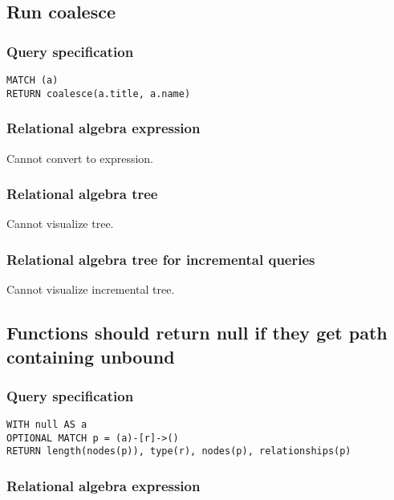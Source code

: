 \subsection{Run coalesce}

\subsubsection*{Query specification}

\begin{lstlisting}
MATCH (a)
RETURN coalesce(a.title, a.name)
\end{lstlisting}

\subsubsection*{Relational algebra expression}

Cannot convert to expression.

\subsubsection*{Relational algebra tree}

Cannot visualize tree.

\subsubsection*{Relational algebra tree for incremental queries}

Cannot visualize incremental tree.

\subsection{Functions should return null if they get path containing unbound}

\subsubsection*{Query specification}

\begin{lstlisting}
WITH null AS a
OPTIONAL MATCH p = (a)-[r]->()
RETURN length(nodes(p)), type(r), nodes(p), relationships(p)
\end{lstlisting}

\subsubsection*{Relational algebra expression}

